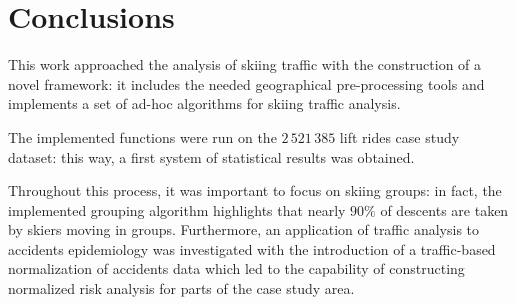 \documentclass[12pt,a4paper,twoside]{book}
\begin{document}

\chapter{Conclusions}

This work approached the analysis of skiing traffic with the construction of a novel framework: it includes the needed geographical pre-processing tools and implements a set of ad-hoc algorithms for skiing traffic analysis.

The implemented functions were run on the $2\,521\,385$ lift rides case study dataset: this way, a first system of statistical results was obtained.

Throughout this process, it was important to focus on skiing groups: in fact, the implemented grouping algorithm highlights that nearly $90\%$ of descents are taken by skiers moving in groups.
Furthermore, an application of traffic analysis to accidents epidemiology was investigated with the introduction of a traffic-based normalization of accidents data which led to the capability of constructing normalized risk analysis for parts of the case study area.

\end{document}
